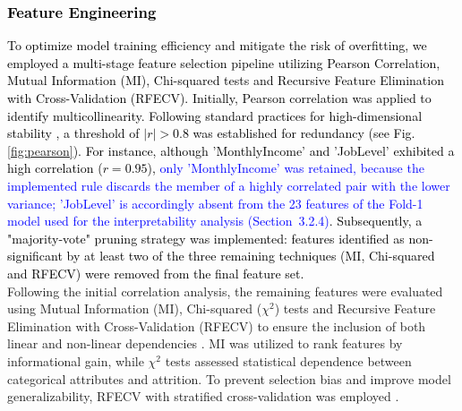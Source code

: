 \documentclass[a4paper,fleqn]{cas-sc}
\begin{document}
\subsubsection{\textcolor{black}{Feature Engineering}}
\textcolor{black}{To optimize model training efficiency and mitigate the risk of overfitting, we employed a multi-stage feature selection pipeline utilizing Pearson Correlation, Mutual Information (MI), Chi-squared tests and Recursive Feature Elimination with Cross-Validation (RFECV). Initially, Pearson correlation was applied to identify multicollinearity. Following standard practices for high-dimensional stability \cite{Pearson1895}, a threshold of $|r| > 0.8$ was established for redundancy (see Fig. \ref{fig:pearson}). For instance, although 'MonthlyIncome' and 'JobLevel' exhibited a high correlation ($r = 0.95$), \textcolor{blue}{only 'MonthlyIncome' was retained, because the implemented rule discards the member of a highly correlated pair with the lower variance; 'JobLevel' is accordingly absent from the 23 features of the Fold-1 model used for the interpretability analysis (Section~3.2.4)}. Subsequently, a "majority-vote" pruning strategy was implemented: features identified as non-significant by at least two of the three remaining techniques (MI, Chi-squared and RFECV) were removed from the final feature set.}\\
Following the initial correlation analysis, the remaining features were evaluated using Mutual Information (MI), Chi-squared ($\chi^2$) tests and Recursive Feature Elimination with Cross-Validation (RFECV) to ensure the inclusion of both linear and non-linear dependencies \cite{CoverThomas1991, Agresti2018}. MI was utilized to rank features by informational gain, while $\chi^2$ tests assessed statistical dependence between categorical attributes and attrition. To prevent selection bias and improve model generalizability, RFECV with stratified cross-validation was employed \cite{Guyon2002, Kohavi1995}.

\end{document}
